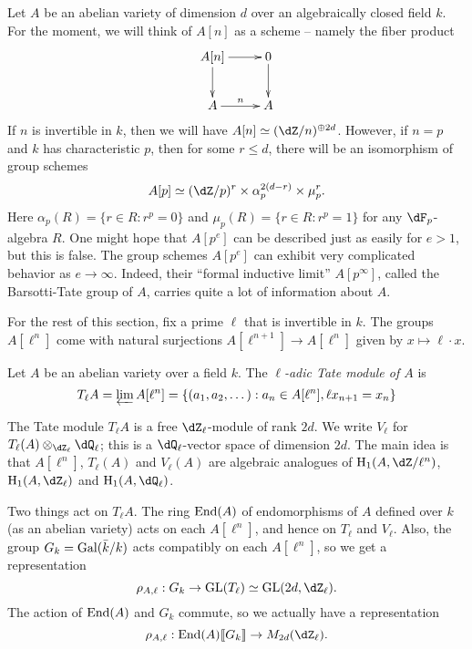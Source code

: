 \documentclass{article}
\begin{document}
Let $A$ be an abelian variety of dimension $d$ over an algebraically closed 
field $k$. For the moment, we will think of $A[n]$ as a scheme -- namely 
the fiber product 
\[\xymatrix{
  A[n] \ar[r] \ar[d] 
    & 0 \ar[d] \\
  A \ar[r]^-n 
    & A 
}\]
If $n$ is invertible in $k$, then we will have 
$A[n]\simeq (\dZ/n)^{\oplus 2 d}$. However, if $n=p$ and $k$ has 
characteristic $p$, then for some $r\leqslant d$, 
there will be an isomorphism of group schemes 
\[
   A[p]\simeq (\dZ/p)^r\times \alpha_p^{2(d-r)}\times \mu_p^r \text{.}
\]
Here $\alpha_p(R)=\{r\in R:r^p=0\}$ and $\mu_p(R)=\{r\in R:r^p=1\}$ for any 
$\dF_p$-algebra $R$. One might hope that $A[p^e]$ can be described just as 
easily for $e>1$, but this is false. The group schemes $A[p^e]$ can exhibit 
very complicated behavior as $e\to \infty$. Indeed, their ``formal inductive 
limit'' $A[p^\infty]$, called the Barsotti-Tate group of $A$, carries quite a 
lot of information about $A$. 

For the rest of this section, fix a prime $\ell$ that is invertible in $k$. 
The groups $A[\ell^n]$ come with natural surjections 
$A[\ell^{n+1}]\to A[\ell^n]$ given by $x\mapsto \ell \cdot x$. 

\begin{definition}
Let $A$ be an abelian variety over a field $k$. The \emph{$\ell$-adic Tate 
module of $A$} is 
\[
  T_\ell A = \varprojlim A[\ell^n] = \{(a_1,a_2,\dots) : a_n\in A[\ell^n],\ell x_{n+1}=x_n\}
\]
\end{definition}

The Tate module $T_\ell A$ is a free $\dZ_\ell$-module of rank $2 d$. We write 
$V_\ell$ for $T_\ell(A)\otimes_{\dZ_\ell} \dQ_\ell$; this is a 
$\dQ_\ell$-vector space of dimension $2 d$. The main idea is that 
$A[\ell^n]$, $T_\ell(A)$ and $V_\ell(A)$ are algebraic analogues of 
$\h_1(A,\dZ/\ell^n)$, $\h_1(A,\dZ_\ell)$ and $\h_1(A,\dQ_\ell)$. 

Two things act on $T_\ell A$. The ring $\operatorname{End}(A)$ of endomorphisms 
of $A$ defined over $k$ (as an abelian variety) acts on each $A[\ell^n]$, and 
hence on $T_\ell$ and $V_\ell$. Also, the group $G_k=\operatorname{Gal}(\bar k/k)$ acts 
compatibly on each $A[\ell^n]$, so we get a representation 
\[
  \rho_{A,\ell}:G_k\to \operatorname{GL}(T_\ell)\simeq \operatorname{GL}(2 d,\dZ_\ell) \text{.}
\]
The action of $\operatorname{End}(A)$ and $G_k$ commute, so we actually have a 
representation 
\[
  \rho_{A,\ell}:\End(A)\llbracket G_k\rrbracket \to M_{2 d}(\dZ_\ell) \text{.}
\]
\end{document}
